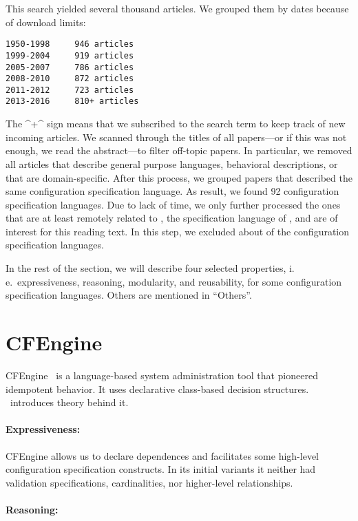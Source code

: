This search yielded several thousand articles.
We grouped them by dates because of download limits:
\begin{verbatim}
1950-1998     946 articles
1999-2004     919 articles
2005-2007     786 articles
2008-2010     872 articles
2011-2012     723 articles
2013-2016     810+ articles
\end{verbatim}

The ^+^ sign means that we subscribed to the search term to keep track of new incoming articles.
We scanned through the titles of all papers---or if this was not enough, we read the abstract---to filter off-topic papers.
In particular, we removed all articles that describe general purpose languages, behavioral descriptions, or that are domain-specific.
After this process, we grouped papers that described the same configuration specification language.
As result, we found 92 configuration specification languages.
Due to lack of time, we only further processed the ones that are at least remotely related to , the specification language of \elektra{}, and are of interest for this reading text.
In this step, we excluded about  of the configuration specification languages.

In the rest of the section, we will describe four selected properties, i.\,e.\ expressiveness, reasoning, modularity, and reusability, for some configuration specification languages.
Others are mentioned in ``Others''.



\section{CFEngine}

CFEngine~\cite{burgess1995cfengine,pandey2012investigating} is a language-based system administration tool that pioneered idempotent behavior.
It uses declarative class-based decision structures.
\citet{burgess2003theory}~introduces theory behind it.

\paragraph*{Expressiveness:}
CFEngine allows us to declare dependences and facilitates some high-level configuration specification constructs.
In its initial variants it neither had validation specifications, cardinalities, nor higher-level relationships.
\paragraph*{Reasoning:}
\notsupported{}
